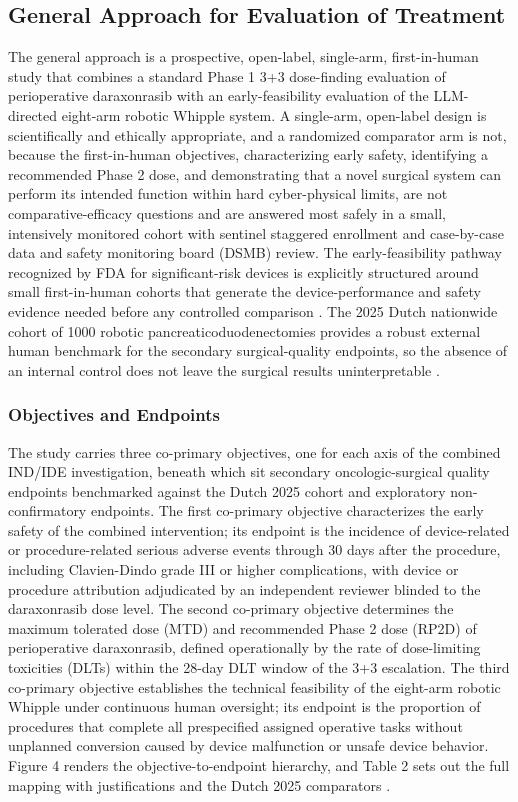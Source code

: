 \subsection{General Approach for Evaluation of Treatment}

The general approach is a prospective, open-label, single-arm, first-in-human study
that combines a standard Phase 1 3+3 dose-finding evaluation of perioperative
daraxonrasib with an early-feasibility evaluation of the LLM-directed eight-arm
robotic Whipple system. A single-arm, open-label design is scientifically and
ethically appropriate, and a randomized comparator arm is not, because the
first-in-human objectives, characterizing early safety, identifying a recommended
Phase 2 dose, and demonstrating that a novel surgical system can perform its
intended function within hard cyber-physical limits, are not comparative-efficacy
questions and are answered most safely in a small, intensively monitored cohort with
sentinel staggered enrollment and case-by-case data and safety monitoring board
(DSMB) review. The early-feasibility pathway recognized by FDA for significant-risk
devices is explicitly structured around small first-in-human cohorts that generate
the device-performance and safety evidence needed before any controlled comparison
\cite{phase1guidance}. The 2025 Dutch nationwide cohort of 1000 robotic
pancreaticoduodenectomies provides a robust external human benchmark for the
secondary surgical-quality endpoints, so the absence of an internal control does not
leave the surgical results uninterpretable \cite{daraxwhipple}.

\subsubsection{Objectives and Endpoints}

The study carries three co-primary objectives, one for each axis of the combined
IND/IDE investigation, beneath which sit secondary oncologic-surgical quality
endpoints benchmarked against the Dutch 2025 cohort and exploratory non-confirmatory
endpoints. The first co-primary objective characterizes the early safety of the
combined intervention; its endpoint is the incidence of device-related or
procedure-related serious adverse events through 30 days after the procedure,
including Clavien-Dindo grade III or higher complications, with device or procedure
attribution adjudicated by an independent reviewer blinded to the daraxonrasib dose
level. The second co-primary objective determines the maximum tolerated dose (MTD)
and recommended Phase 2 dose (RP2D) of perioperative daraxonrasib, defined
operationally by the rate of dose-limiting toxicities (DLTs) within the 28-day DLT
window of the 3+3 escalation. The third co-primary objective establishes the
technical feasibility of the eight-arm robotic Whipple under continuous human
oversight; its endpoint is the proportion of procedures that complete all
prespecified assigned operative tasks without unplanned conversion caused by device
malfunction or unsafe device behavior. Figure 4 renders the objective-to-endpoint
hierarchy, and Table 2 sets out the full mapping with justifications and the Dutch
2025 comparators \cite{daraxwhipple,phase1guidance}.


